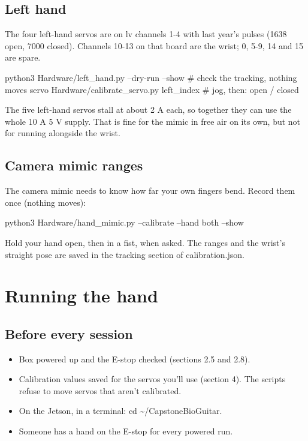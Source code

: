 \documentclass[11pt,letterpaper]{article}
\newcommand{\code}[1]{\textcolor{codeblue}{\ttfamily\smaller\relax #1}}
\begin{document}
\subsection{Left hand}
The four left-hand servos are on \code{lv} channels 1-4 with last year's pulses (1638 open, 7000 closed). Channels 10-13 on that board are the wrist; 0, 5-9, 14 and 15 are spare.

\begin{codeblock}
python3 Hardware/left_hand.py --dry-run --show      # check the tracking, nothing moves
servo Hardware/calibrate_servo.py left_index        # jog, then: open / closed
\end{codeblock}
The five left-hand servos stall at about 2 A each, so together they can use the whole 10 A 5 V supply. That is fine for the mimic in free air on its own, but not for running alongside the wrist.


\subsection{Camera mimic ranges}
The camera mimic needs to know how far your own fingers bend. Record them once (nothing moves):

\begin{codeblock}
python3 Hardware/hand_mimic.py --calibrate --hand both --show
\end{codeblock}
Hold your hand open, then in a fist, when asked. The ranges and the wrist's straight pose are saved in the \code{tracking} section of \code{calibration.json}.


\section{Running the hand}

\subsection{Before every session}
\begin{itemize}
  \item Box powered up and the E-stop checked (sections 2.5 and 2.8).
  \item Calibration values saved for the servos you'll use (section 4). The scripts refuse to move servos that aren't calibrated.
  \item On the Jetson, in a terminal: \code{cd \textasciitilde{}/\allowbreak{}CapstoneBioGuitar}.
  \item Someone has a hand on the E-stop for every powered run.
\end{itemize}
\end{document}
